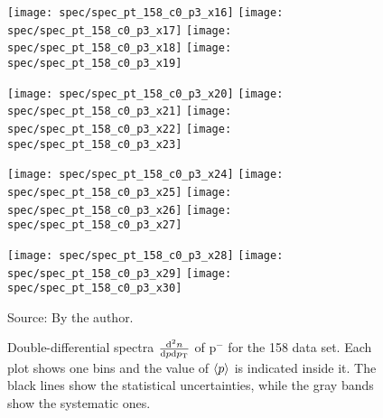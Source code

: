 \begin{figure}[!ht]
  \centering

  \texttt{[image: spec/spec\_pt\_158\_c0\_p3\_x16]}
  \texttt{[image: spec/spec\_pt\_158\_c0\_p3\_x17]}
  \texttt{[image: spec/spec\_pt\_158\_c0\_p3\_x18]}
  \texttt{[image: spec/spec\_pt\_158\_c0\_p3\_x19]}

  \texttt{[image: spec/spec\_pt\_158\_c0\_p3\_x20]}
  \texttt{[image: spec/spec\_pt\_158\_c0\_p3\_x21]}
  \texttt{[image: spec/spec\_pt\_158\_c0\_p3\_x22]}
  \texttt{[image: spec/spec\_pt\_158\_c0\_p3\_x23]}

  \texttt{[image: spec/spec\_pt\_158\_c0\_p3\_x24]}
  \texttt{[image: spec/spec\_pt\_158\_c0\_p3\_x25]}
  \texttt{[image: spec/spec\_pt\_158\_c0\_p3\_x26]}
  \texttt{[image: spec/spec\_pt\_158\_c0\_p3\_x27]}

  \texttt{[image: spec/spec\_pt\_158\_c0\_p3\_x28]}
  \texttt{[image: spec/spec\_pt\_158\_c0\_p3\_x29]}
  \texttt{[image: spec/spec\_pt\_158\_c0\_p3\_x30]}

  \caption{Double-differential spectra $\frac{\text{d}^2n}{\text{d}p\text{d}p_\text{T}}$
    of p$^-$ for the 158 \GeVc data set. Each plot shows one \pp bins and the value
    of $\langle p\rangle$ is indicated inside it. The black lines show the statistical
    uncertainties, while the gray bands show the systematic ones.}
  \label{fig:hadron:spec:dedx:all158:c1p3}
  \begin{center}
    \small Source: By the author. 
  \end{center}
\end{figure}


